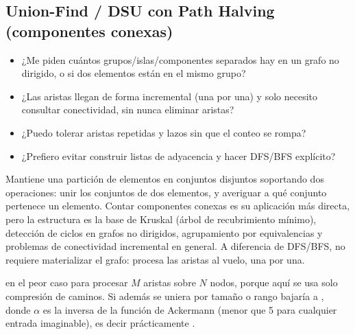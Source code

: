 \subsection{Union-Find / DSU con Path Halving (componentes conexas)}
\label{alg:4-9}


\begin{itemize}
\item ¿Me piden cuántos grupos/islas/componentes separados hay en un grafo no dirigido, o si dos elementos están en el mismo grupo?
\item ¿Las aristas llegan de forma incremental (una por una) y solo necesito consultar conectividad, sin nunca eliminar aristas?
\item ¿Puedo tolerar aristas repetidas y lazos sin que el conteo se rompa?
\item ¿Prefiero evitar construir listas de adyacencia y hacer DFS/BFS explícito?
\end{itemize}

 Mantiene una partición de elementos en conjuntos disjuntos soportando dos operaciones: unir los conjuntos de dos elementos, y averiguar a qué conjunto pertenece un elemento. Contar componentes conexas es su aplicación más directa, pero la estructura es la base de Kruskal (árbol de recubrimiento mínimo), detección de ciclos en grafos no dirigidos, agrupamiento por equivalencias y problemas de conectividad incremental en general. A diferencia de DFS/BFS, no requiere materializar el grafo: procesa las aristas al vuelo, una por una.

  en el peor caso para procesar $M$ aristas sobre $N$ nodos, porque aquí se usa solo compresión de caminos. Si además se uniera por tamaño o rango bajaría a , donde $\alpha$ es la inversa de la función de Ackermann (menor que 5 para cualquier entrada imaginable), es decir prácticamente .

